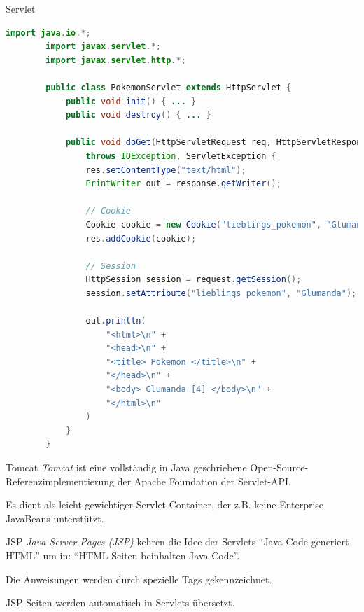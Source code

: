 \begin{example}{Servlet}
    \begin{lstlisting}[language=Java]
        import java.io.*;
        import javax.servlet.*;
        import javax.servlet.http.*;

        public class PokemonServlet extends HttpServlet {
            public void init() { ... }
            public void destroy() { ... }

            public void doGet(HttpServletRequest req, HttpServletResponse res)
                throws IOException, ServletException {
                res.setContentType("text/html");
                PrintWriter out = response.getWriter();

                // Cookie
                Cookie cookie = new Cookie("lieblings_pokemon", "Glumanda");
                res.addCookie(cookie);

                // Session
                HttpSession session = request.getSession();
                session.setAttribute("lieblings_pokemon", "Glumanda");
                
                out.println(
                    "<html>\n" +
                    "<head>\n" +
                    "<title> Pokemon </title>\n" +
                    "</head>\n" +
                    "<body> Glumanda [4] </body>\n" +
                    "</html>\n"
                )
            }
        }
    \end{lstlisting}
\end{example}

\begin{defi}{Tomcat}
    \emph{Tomcat} ist eine vollständig in Java geschriebene Open-Source-Referenzimplementierung der Apache Foundation der Servlet-API.

    Es dient als leicht-gewichtiger Servlet-Container, der z.B. keine Enterprise JavaBeans unterstützt.
\end{defi}

\begin{defi}{JSP}
    \emph{Java Server Pages (JSP)} kehren die Idee der Servlets \enquote{Java-Code generiert HTML} um in: \enquote{HTML-Seiten beinhalten Java-Code}.

    Die Anweisungen werden durch spezielle Tags gekennzeichnet.

    JSP-Seiten werden automatisch in Servlets übersetzt.
\end{defi}

